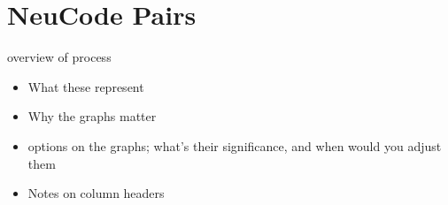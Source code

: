 
\section{NeuCode Pairs}
overview of process

\begin{itemize}
	\item What these represent
	\item Why the graphs matter
	\item options on the graphs; what's their significance, and when would you adjust them
	\item Notes on column headers
\end{itemize}